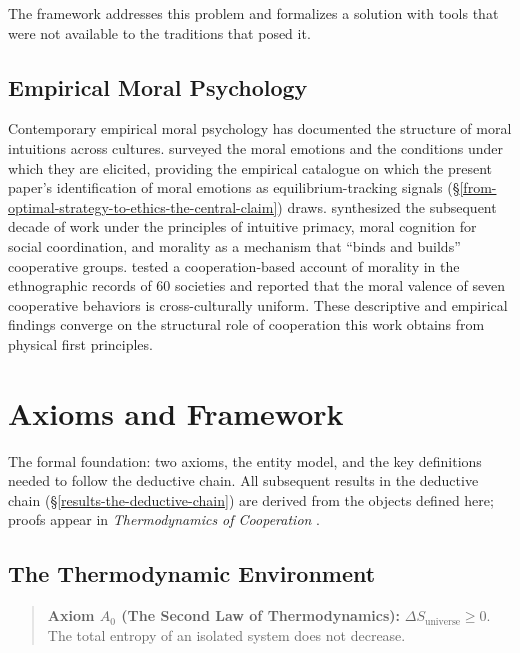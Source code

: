 \documentclass[11pt]{article}
\theoremstyle{plain}
\theoremstyle{definition}
\theoremstyle{remark}
\let\origsection\section
\renewcommand{\section}{\needspace{12\baselineskip}\origsection}
\let\origsubsection\subsection
\renewcommand{\subsection}{\needspace{7\baselineskip}\origsubsection}
\begin{document}
The framework addresses this problem and formalizes a solution with
tools that were not available to the traditions that posed it.

\subsection{Empirical Moral
Psychology}\label{empirical-moral-psychology}

Contemporary empirical moral psychology has documented the structure of
moral intuitions across cultures. \citet{Haidt2003} surveyed the moral
emotions and the conditions under which they are elicited, providing the
empirical catalogue on which the present paper's identification of moral
emotions as equilibrium-tracking signals
(§\ref{from-optimal-strategy-to-ethics-the-central-claim}) draws.
\citet{Haidt2010} synthesized the subsequent decade of work under the
principles of intuitive primacy, moral cognition for social
coordination, and morality as a mechanism that ``binds and builds''
cooperative groups. \citet{Curry2019} tested a cooperation-based account
of morality in the ethnographic records of 60 societies and reported
that the moral valence of seven cooperative behaviors is
cross-culturally uniform. These descriptive and empirical findings
converge on the structural role of cooperation this work obtains from
physical first principles.

\section{Axioms and Framework}\label{axioms-and-framework}

The formal foundation: two axioms, the entity model, and the key
definitions needed to follow the deductive chain. All subsequent results
in the deductive chain (§\ref{results-the-deductive-chain}) are derived
from the objects defined here; proofs appear in \emph{Thermodynamics of
Cooperation} \citep{TC-I, TC-II, TC-III, TC-IV, TC-V, TC-VI}.

\subsection{The Thermodynamic
Environment}\label{the-thermodynamic-environment}

\begin{quote}
\textbf{Axiom \(A_0\) (The Second Law of Thermodynamics):}
\(\Delta S_{\text{universe}} \geq 0\). The total entropy of an isolated
system does not decrease.
\end{quote}
\end{document}
